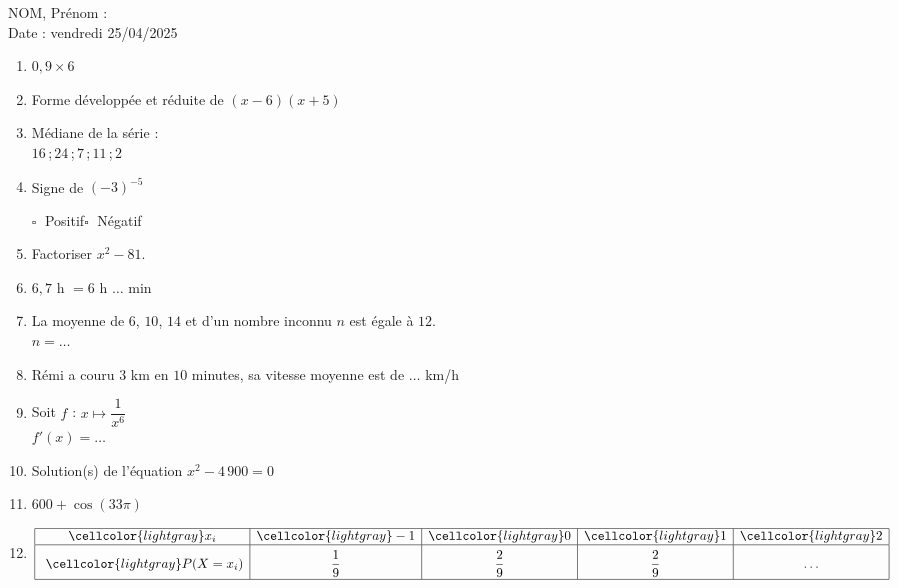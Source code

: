 \documentclass[a4paper,11pt,landscape,exos]{nsi} %
\begin{document}
\begin{multicols}{2}
    \textcolor{UGLiBlue}{NOM, Prénom :\\
    Date : vendredi 25/04/2025}\\
\maketitle

\begin{enumerate}[itemsep=1em]
	\item $0{,}9 \times 6$ 
	\item Forme développée et réduite de $(x-6)(x+5)$
	\item Médiane de la série :\\$16$\,;\,$24$\,;\,$7$\,;\,$11$\,;\,$2$ 
	\item Signe de  $(-3)^{-5}$ 
    
    	$\square\;$ Positif\qquad $\square\;$ Négatif\qquad 
	\item  Factoriser  $x^2-81$.
	\item $6{,}7$  h $ = 6$ h $\ldots$ min
	\item La moyenne de $6$, $10$, $14$ et d'un nombre inconnu $n$ est égale à $12$.\\$n=\ldots$
	\item Rémi a couru $3$ km en $10$ minutes, sa vitesse moyenne est de   $\ldots$ km/h
	\item Soit $f$ : $x\longmapsto \dfrac{1}{x^6}$\\$f'(x)=\ldots$
	\item Solution(s) de l'équation  $x^2-4\,900=0$
	\item  $600 + \cos(33\pi)$
	\item $\renewcommand{\arraystretch}{1}
\begin{array}{|c|c|c|c|c|}
\hline
\cellcolor{lightgray} x_i & \cellcolor{lightgray} -1 & \cellcolor{lightgray} 0 & \cellcolor{lightgray} 1 & \cellcolor{lightgray} 2\\
\hline
 \rule[-2ex]{0pt} {6ex}\ \cellcolor{lightgray} P(X=x_i) & \dfrac{1}{9} & \dfrac{2}{9} & \dfrac{2}{9} & \ldots\\
\hline
 \end{array}
\renewcommand{\arraystretch}{1}$



\end{enumerate}
\end{multicols}
\end{document}
